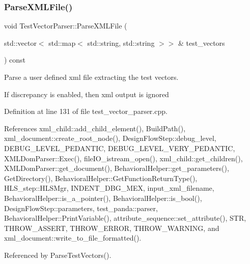 \subsubsection{\texorpdfstring{Parse\+X\+M\+L\+File()}{ParseXMLFile()}}
{\footnotesize\ttfamily void Test\+Vector\+Parser\+::\+Parse\+X\+M\+L\+File (\begin{DoxyParamCaption}\item[{std\+::vector$<$ std\+::map$<$ std\+::string, std\+::string $>$$>$ \&}]{test\+\_\+vectors }\end{DoxyParamCaption}) const\hspace{0.3cm}{\ttfamily [private]}}



Parse a user defined xml file extracting the test vectors. 

If discrepancy is enabled, then xml output is ignored 

Definition at line 131 of file test\+\_\+vector\+\_\+parser.\+cpp.



References xml\+\_\+child\+::add\+\_\+child\+\_\+element(), Build\+Path(), xml\+\_\+document\+::create\+\_\+root\+\_\+node(), Design\+Flow\+Step\+::debug\+\_\+level, D\+E\+B\+U\+G\+\_\+\+L\+E\+V\+E\+L\+\_\+\+P\+E\+D\+A\+N\+T\+IC, D\+E\+B\+U\+G\+\_\+\+L\+E\+V\+E\+L\+\_\+\+V\+E\+R\+Y\+\_\+\+P\+E\+D\+A\+N\+T\+IC, X\+M\+L\+Dom\+Parser\+::\+Exec(), file\+I\+O\+\_\+istream\+\_\+open(), xml\+\_\+child\+::get\+\_\+children(), X\+M\+L\+Dom\+Parser\+::get\+\_\+document(), Behavioral\+Helper\+::get\+\_\+parameters(), Get\+Directory(), Behavioral\+Helper\+::\+Get\+Function\+Return\+Type(), H\+L\+S\+\_\+step\+::\+H\+L\+S\+Mgr, I\+N\+D\+E\+N\+T\+\_\+\+D\+B\+G\+\_\+\+M\+EX, input\+\_\+xml\+\_\+filename, Behavioral\+Helper\+::is\+\_\+a\+\_\+pointer(), Behavioral\+Helper\+::is\+\_\+bool(), Design\+Flow\+Step\+::parameters, test\+\_\+panda\+::parser, Behavioral\+Helper\+::\+Print\+Variable(), attribute\+\_\+sequence\+::set\+\_\+attribute(), S\+TR, T\+H\+R\+O\+W\+\_\+\+A\+S\+S\+E\+RT, T\+H\+R\+O\+W\+\_\+\+E\+R\+R\+OR, T\+H\+R\+O\+W\+\_\+\+W\+A\+R\+N\+I\+NG, and xml\+\_\+document\+::write\+\_\+to\+\_\+file\+\_\+formatted().



Referenced by Parse\+Test\+Vectors().

